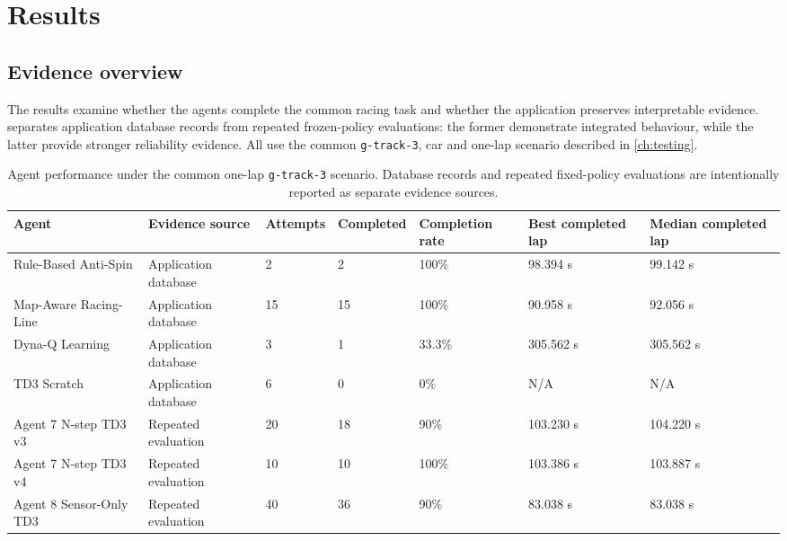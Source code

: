 \section{Results}
\label{ch:results}

\subsection{Evidence overview}

The results examine whether the agents complete the common racing task and whether the application preserves interpretable evidence.  separates application database records from repeated frozen-policy evaluations: the former demonstrate integrated behaviour, while the latter provide stronger reliability evidence. All use the common \texttt{g-track-3}, car and one-lap scenario described in \cref{ch:testing}.

\begin{table}[htbp]
  \centering
  \caption{Agent performance under the common one-lap \texttt{g-track-3} scenario. Database records and repeated fixed-policy evaluations are intentionally reported as separate evidence sources.}
  \label{tab:agent-results}
  \small
  \begin{tabularx}{\textwidth}{p{}p{}p{}p{}p{}YY}
    \toprule
    Agent & Evidence source & Attempts & Completed & Completion rate & Best completed lap & Median completed lap \\
    \midrule
    Rule-Based Anti-Spin & Application database & 2 & 2 & 100\% & 98.394 s & 99.142 s \\
    Map-Aware Racing-Line & Application database & 15 & 15 & 100\% & 90.958 s & 92.056 s \\
    Dyna-Q Learning & Application database & 3 & 1 & 33.3\% & 305.562 s & 305.562 s \\
    TD3 Scratch & Application database & 6 & 0 & 0\% & N/A & N/A \\
    Agent 7 N-step TD3 v3 & Repeated evaluation & 20 & 18 & 90\% & 103.230 s & 104.220 s \\
    Agent 7 N-step TD3 v4 & Repeated evaluation & 10 & 10 & 100\% & 103.386 s & 103.887 s \\
    Agent 8 Sensor-Only TD3 & Repeated evaluation & 40 & 36 & 90\% & 83.038 s & 83.038 s \\
    \bottomrule
  \end{tabularx}
\end{table}

